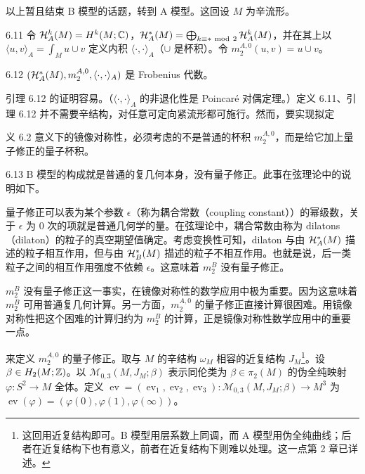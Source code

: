 以上暂且结束 B 模型的话题，转到 A 模型。这回设 $M$ 为辛流形。

\begin{definition}{6.11}
  令 $\mathcal{H}_A^k(M)=H^k(M;\mathbb{C})$，$\cH_A^*(M)=\bigoplus_{k\equiv*\ \mathrm{mod}\ 2}\cH_A^k(M)$，并在其上以 $\langle u,v\rangle_A=\int_Mu\cup v$ 定义内积 $\langle\cdot,\cdot\rangle_A$（$\cup$ 是杯积）。令 $m_2^{A,0}(u,v)=u\cup v$。
\end{definition}

\begin{lemma}{6.12}
  $(\mathcal{H}_A^*(M),m_2^{A,0},\langle\cdot,\cdot\rangle_A)$ 是 Frobenius 代数。
\end{lemma}

引理 6.12 的证明容易。（$\langle\cdot,\cdot\rangle_A$ 的非退化性是 Poincaré 对偶定理。）定义 6.11、引理 6.12 并不需要辛结构，对任意可定向紧流形都可施行。然而，要实现拟定

义 6.2 意义下的镜像对称性，必须考虑的不是普通的杯积 $m_2^{A,0}$，而是给它加上量子修正的量子杯积。

\begin{remark}{6.13}
  B 模型的构成就是普通的复几何本身，没有量子修正。此事在弦理论中的说明如下。

  量子修正可以表为某个参数 $\epsilon$（称为耦合常数（coupling constant））的幂级数，关于 $\epsilon$ 为 0 次的项就是普通几何学的量。在弦理论中，耦合常数由称为 dilatons（dilaton）的粒子的真空期望值确定。考虑变换性可知，dilaton 与由 $\mathcal{H}_A^*(M)$ 描述的粒子相互作用，但与由 $\mathcal{H}_B^*(M)$ 描述的粒子不相互作用。也就是说，后一类粒子之间的相互作用强度不依赖 $\epsilon$。这意味着 $m_2^B$ 没有量子修正。
\end{remark}

$m_2^B$ 没有量子修正这一事实，在镜像对称性的数学应用中极为重要。因为这意味着 $m_2^B$ 可用普通复几何计算。另一方面，$m_2^{A,0}$ 的量子修正直接计算很困难。用镜像对称性把这个困难的计算归约为 $m_2^B$ 的计算，正是镜像对称性数学应用中的重要一点。

来定义 $m_2^{A,0}$ 的量子修正。取与 $M$ 的辛结构 $\omega_M$ 相容的近复结构 $J_M$\footnote{这回用近复结构即可。B 模型用层系数上同调，而 A 模型用伪全纯曲线；后者在近复结构下也有意义，前者在近复结构下则难以处理。这一点第 2 章已详述。}。设 $\beta\in H_2(M;\mathbb{Z})$。以 $\mathcal{M}_{0,3}(M,J_M;\beta)$ 表示同伦类为 $\beta\in\pi_2(M)$ 的伪全纯映射 $\varphi\colon S^2\to M$ 全体。定义 $\operatorname{ev}=(\operatorname{ev}_1,\operatorname{ev}_2,\operatorname{ev}_3)\colon\mathcal{M}_{0,3}(M,J_M;\beta)\to M^3$ 为 $\operatorname{ev}(\varphi)=(\varphi(0),\varphi(1),\varphi(\infty))$。


